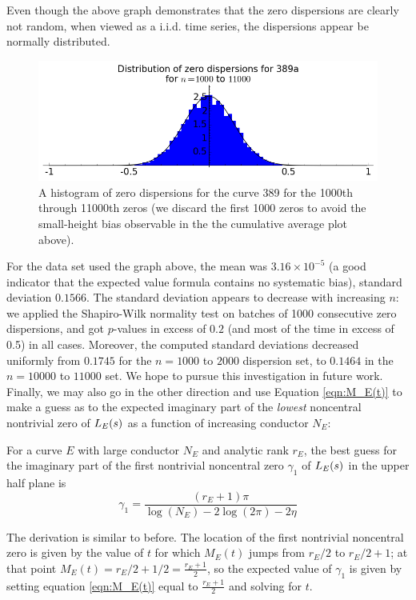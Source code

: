 Even though the above graph demonstrates that the zero dispersions are clearly not random, when viewed as a i.i.d. time series, the dispersions appear be normally distributed. \\

\begin{figure}[!h]
    \centering
    \includegraphics[width=1.0\textwidth]{graphics/389a_zero_dispersions_histagram.png}
    \caption{A histogram of zero dispersions for the curve 389 for the 1000th through 11000th zeros (we discard the first 1000 zeros to avoid the small-height bias observable in the the cumulative average plot above). }
    \label{fig:389a_zero_dispersions_histagram}
\end{figure}

For the data set used the graph above, the mean was $3.16\times10^{-5}$ (a good indicator that the expected value formula contains no systematic bias), standard deviation $0.1566$. The standard deviation appears to decrease with increasing $n$: we applied the Shapiro-Wilk normality test on batches of 1000 consecutive zero dispersions, and got $p$-values in excess of $0.2$ (and most of the time in excess of 0.5) in all cases. Moreover, the computed standard deviations decreased uniformly from $0.1745$ for the $n=1000$ to $2000$ dispersion set, to $0.1464$ in the $n=10000$ to $11000$ set. We hope to pursue this investigation in future work. \\

Finally, we may also go in the other direction and use Equation \ref{eqn:M_E(t)} to make a guess as to the expected imaginary part of the {\it lowest} noncentral nontrivial zero of $L_E(s)$ as a function of increasing conductor $N_E$:
\begin{proposition}
For a curve $E$ with large conductor $N_E$ and analytic rank $r_E$, the best guess for the imaginary part of the first nontrivial noncentral zero $\gamma_1$ of $L_E(s)$ in the upper half plane is
\begin{equation}
\gamma_1 = \frac{(r_E+1)\pi}{\log(N_E) -2\log(2\pi) -2\eta}
\end{equation}
\end{proposition}
The derivation is similar to before. The location of the first nontrivial noncentral zero is given by the value of $t$ for which $M_E(t)$ jumps from $r_E/2$ to $r_E/2+1$; at that point $M_E(t) = r_E/2 + 1/2 = \frac{r_E+1}{2}$, so the expected value of $\gamma_1$ is given by setting equation \ref{eqn:M_E(t)} equal to $\frac{r_E+1}{2}$ and solving for $t$. \\

